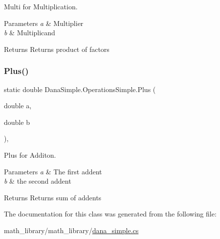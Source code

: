 Multi for Multiplication. 


\begin{DoxyParams}{Parameters}
{\em a} & Multiplier \\
\hline
{\em b} & Multiplicand \\
\hline
\end{DoxyParams}
\begin{DoxyReturn}{Returns}
Returns product of factors 
\end{DoxyReturn}
\mbox{\label{classDanaSimple_1_1OperationsSimple_a4db87aef7a77f2c4f4060154c6329db9}} 
\subsubsection{\texorpdfstring{Plus()}{Plus()}}
{\footnotesize\ttfamily static double Dana\+Simple.\+Operations\+Simple.\+Plus (\begin{DoxyParamCaption}\item[{double}]{a,  }\item[{double}]{b }\end{DoxyParamCaption})\hspace{0.3cm}{\ttfamily [inline]}, {\ttfamily [static]}}



Plus for Additon. 


\begin{DoxyParams}{Parameters}
{\em a} & The first addent \\
\hline
{\em b} & the second addent \\
\hline
\end{DoxyParams}
\begin{DoxyReturn}{Returns}
Returns sum of addents 
\end{DoxyReturn}


The documentation for this class was generated from the following file\+:\begin{DoxyCompactItemize}
\item 
math\+\_\+library/math\+\_\+library/\hyperlink{dana__simple_8cs}{dana\+\_\+simple.\+cs}\end{DoxyCompactItemize}
